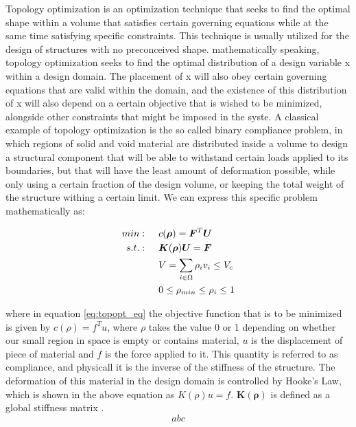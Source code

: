 \documentclass[../main.tex]{subfiles}
\begin{document}
Topology optimization is an optimization technique that seeks to find the optimal shape within a volume that satisfies certain governing equations while at the same time satisfying specific constraints. This technique is usually utilized for the design of structures with no preconceived shape. mathematically speaking, topology optimization seeks to find the optimal distribution of a design variable x within a design domain. The placement of x will also obey certain governing equations that are valid within the domain, and the existence of this distribution of x will also depend on a certain objective that is wished to be minimized, alongside other constraints that might be imposed in the syste. A classical example of topology optimization is the so called binary compliance problem, in which regions of solid and void material are distributed inside a volume to design a structural component that will be able to withstand certain loads applied to its boundaries, but that will have the least amount of deformation possible, while only using a certain fraction of the design volume, or keeping the total weight of the structure withing a certain limit. We can express this specific problem mathematically as:

\begin{align} 
  min: & \hspace{0.5cm} c(\bm{\rho}) = \bm{F}^T \bm{U}  \\
  s.t.: & \hspace{0.5cm} \bm{K}(\bm{\rho})\bm{U} = \bm{F}  \\
        & \hspace{0.5cm} V = \sum _{i \in \Omega} \rho_i v_i \leq V_c \\ 
        & \hspace{0.5cm} 0 \leq \rho_{min} \leq \rho_i \leq 1
\end{align}
\label{eq:topopt_eq}

where in equation \ref{eq:topopt_eq} the objective function that is to be minimized is given by $c(\rho) = f^T u$, where $\rho$ takes the value 0 or 1 depending on whether our small region in space is empty or contains material, $u$ is the displacement of piece of material and $f$ is the force applied to it. This quantity is referred to as compliance, and physicall it is the inverse of the stiffness of the structure. The deformation of this material in the design domain is controlled by Hooke's Law, which is shown in the above equation as $K(\rho) u = f$. $\bm{K}(\bm{\rho})$ is defined as a global stiffness matrix \cite{hornbergerFiniteElementMethod2005}.
\begin{equation}
  abc
  \label{eq:stiffness}
\end{equation}
\end{document}
